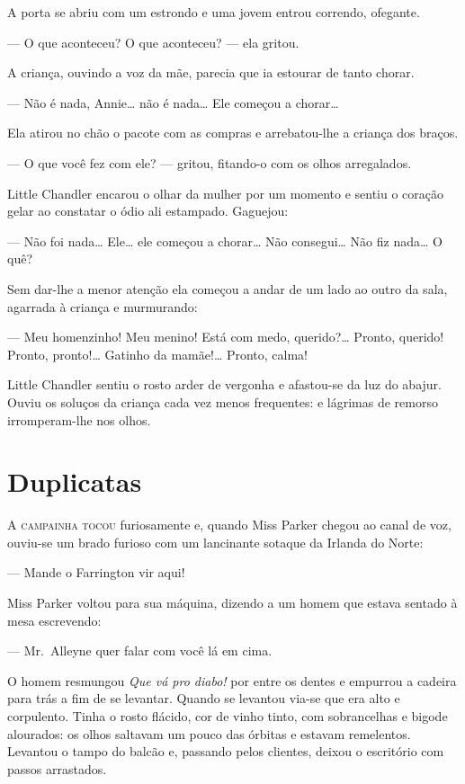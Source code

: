A porta se abriu com um estrondo e uma jovem entrou correndo, ofegante.

--- O que aconteceu? O que aconteceu? --- ela gritou.

A criança, ouvindo a voz da mãe, parecia que ia estourar de tanto chorar.

--- Não é nada, Annie\ldots{} não é nada\ldots{} Ele começou a chorar\ldots{}

Ela atirou no chão o pacote com as compras e arrebatou-lhe a criança dos
braços.

--- O que você fez com ele? --- gritou, fitando-o com os olhos arregalados.

Little Chandler encarou o olhar da mulher por um momento e sentiu o coração
gelar ao constatar o ódio ali estampado.  Gaguejou:

--- Não foi nada\ldots{} Ele\ldots{} ele começou a chorar\ldots{} Não
consegui\ldots{} Não fiz nada\ldots{} O quê?

Sem dar-lhe a menor atenção ela começou a andar de um lado ao outro da sala,
agarrada à criança e murmurando:

--- Meu homenzinho!  Meu menino!  Está com medo, querido?\ldots{} Pronto,
querido!  Pronto, pronto!\ldots{} Gatinho da mamãe!\ldots{} Pronto, calma!

Little Chandler sentiu o rosto arder de vergonha e afastou-se da luz do abajur.
Ouviu os soluços da criança cada vez menos frequentes: e lágrimas de remorso
irromperam-lhe nos olhos.


\chapter{Duplicatas}

\textsc{A campainha tocou} furiosamente e, quando Miss Parker chegou ao canal
de voz, ouviu-se um brado furioso com um lancinante sotaque da Irlanda do
Norte:

--- Mande o Farrington vir aqui!

Miss Parker voltou para sua máquina, dizendo a um homem que estava sentado à
mesa escrevendo:

--- Mr.~Alleyne quer falar com você lá em cima.

O homem resmungou \textit{Que vá pro diabo!} por entre os dentes e empurrou a
cadeira para trás a fim de se levantar.  Quando se levantou via-se que era alto
e corpulento.  Tinha o rosto flácido, cor de vinho tinto, com sobrancelhas e
bigode alourados: os olhos saltavam um pouco das órbitas e estavam remelentos.
Levantou o tampo do balcão e, passando pelos clientes, deixou o escritório com
passos arrastados.

